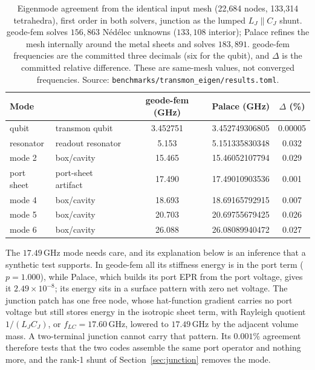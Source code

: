 \documentclass{anvil-paper}
\begin{document}
\begin{table}[tbp]
  \centering
  \caption{Eigenmode agreement from the identical input mesh (22{,}684
  nodes, 133{,}314 tetrahedra), first order in both solvers, junction as
  the lumped $L_J \parallel C_J$ shunt. geode-fem solves $156{,}863$
  N\'ed\'elec unknowns ($133{,}108$ interior); Palace refines the mesh
  internally around the metal sheets and solves $183{,}891$. geode-fem
  frequencies are the committed three decimals (six for the qubit), and
  $\Delta$ is the committed relative difference. These are same-mesh
  values, not converged frequencies. Source:
  \texttt{benchmarks/transmon\_eigen/results.toml}.}
  \label{tab:agreement}
  \small
  \begin{tabular}{@{}llccc@{}}
    \toprule
    Mode & & geode-fem (GHz) & Palace (GHz) & $\Delta$ (\%) \\
    \midrule
    qubit & transmon qubit & 3.452751 & 3.452749306805 & 0.00005 \\
    resonator & readout resonator & 5.153 & 5.151335830348 & 0.032 \\
    mode 2 & box/cavity & 15.465 & 15.46052107794 & 0.029 \\
    port sheet & port-sheet artifact & 17.490 & 17.49010903536 & 0.001 \\
    mode 4 & box/cavity & 18.693 & 18.69165792915 & 0.007 \\
    mode 5 & box/cavity & 20.703 & 20.69755679425 & 0.026 \\
    mode 6 & box/cavity & 26.088 & 26.08089940472 & 0.027 \\
    \bottomrule
  \end{tabular}
\end{table}

The $17.49$\,GHz mode needs care, and its explanation below is an
inference that a synthetic test supports. In geode-fem all its stiffness energy is
in the port term ($p = 1.000$), while Palace, which builds its port EPR
from the port voltage, gives it $2.49\times10^{-8}$; its energy sits in a
surface pattern with zero net voltage. The junction patch has one free
node, whose hat-function gradient carries no port voltage but still
stores energy in the isotropic sheet term, with Rayleigh quotient
$1/(L_JC_J)$, or $f_{LC} = 17.60$\,GHz, lowered to $17.49$\,GHz by the
adjacent volume mass. A two-terminal junction cannot carry that pattern.
Its $0.001\%$ agreement therefore tests that the two codes assemble the
same port operator and nothing more, and the rank-1 shunt of
Section~\ref{sec:junction} removes the mode.
\end{document}
